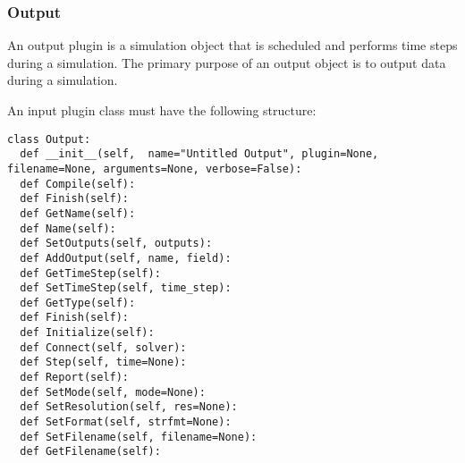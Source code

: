 \documentclass[12pt]{article}
\begin{document}
\subsubsection*{Output}

An output plugin is a simulation object that is scheduled and performs time steps during a simulation. The primary purpose of an output object is to output data during a simulation.

An input plugin class must have the following structure:

\begin{verbatim}
class Output:
  def __init__(self,  name="Untitled Output", plugin=None, filename=None, arguments=None, verbose=False):
  def Compile(self):
  def Finish(self):
  def GetName(self):
  def Name(self):
  def SetOutputs(self, outputs):
  def AddOutput(self, name, field):
  def GetTimeStep(self):
  def SetTimeStep(self, time_step):
  def GetType(self):
  def Finish(self):
  def Initialize(self):
  def Connect(self, solver):
  def Step(self, time=None):
  def Report(self):
  def SetMode(self, mode=None):
  def SetResolution(self, res=None):
  def SetFormat(self, strfmt=None):
  def SetFilename(self, filename=None):
  def GetFilename(self):
\end{verbatim}
\end{document}
